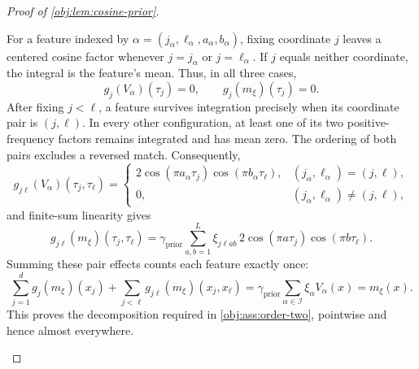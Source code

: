 \begin{proof}[Proof of \cref{obj:lem:cosine-prior}]
\begin{enumerate}
For a feature indexed by
\(\alpha=(j_\alpha,\ell_\alpha,a_\alpha,b_\alpha)\), fixing coordinate \(j\)
leaves a centered cosine factor whenever \(j=j_\alpha\) or
\(j=\ell_\alpha\). If \(j\) equals neither coordinate, the integral is the
feature's mean. Thus, in all three cases,
\[
g_j(V_\alpha)(\tau_j)=0,
\qquad
g_j(m_\xi)(\tau_j)=0.
\]
After fixing \(j<\ell\), a feature survives integration precisely when its
coordinate pair is \((j,\ell)\). In every other configuration, at least one
of its two positive-frequency factors remains integrated and has mean
zero. The ordering of both pairs excludes a reversed match. Consequently,
\[
g_{j\ell}(V_\alpha)(\tau_j,\tau_\ell)
=
\begin{cases}
2\cos(\pi a_\alpha\tau_j)\cos(\pi b_\alpha\tau_\ell),
  &(j_\alpha,\ell_\alpha)=(j,\ell),\\
0,&(j_\alpha,\ell_\alpha)\ne(j,\ell),
\end{cases}
\]
and finite-sum linearity gives
\[
g_{j\ell}(m_\xi)(\tau_j,\tau_\ell)
=\gamma_{\mathrm{prior}}
  \sum_{a,b=1}^L\xi_{j\ell ab}
  \,2\cos(\pi a\tau_j)\cos(\pi b\tau_\ell).
\]
Summing these pair effects counts each feature exactly once:
\[
\sum_{j=1}^d g_j(m_\xi)(x_j)
+\sum_{j<\ell}g_{j\ell}(m_\xi)(x_j,x_\ell)
=\gamma_{\mathrm{prior}}
  \sum_{\alpha\in\mathcal I}\xi_\alpha V_\alpha(x)
=m_\xi(x).
\]
This proves the decomposition required in \cref{obj:ass:order-two},
pointwise and hence almost everywhere.


\end{enumerate}
\end{proof}
